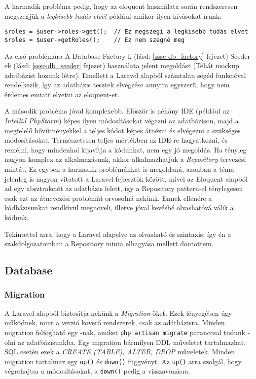 \documentclass[a4paper,12pt]{thesis-ekf}
\theoremstyle{definition}
\begin{document}
				A harmadik probléma pedig, hogy az eloquent használata során rendszeresen megszegjük a \emph{legkisebb tudás elvét} például amikor ilyen hívásokat írunk:
				\begin{lstlisting}
$roles = $user->roles->get();  // Ez megszegi a legkisebb tudás elvét
$roles = $user->getRoles();    // Ez nem szegné meg
				\end{lstlisting}
				
				Az első problémára A Database Factory-k (lásd: \ref{sssc-db_factory} fejezet) Seeder-ek (lásd: \ref{sssc-db_seeder} fejezet) használata jelent megoldást (Tehát mockup adatbázist hozunk létre). Emellett a Laravel alapból számtalan segéd funkcióval rendelkezik, így az adatbázis tesztek elvégzése annyira egyszerű, hogy nem érdemes emiatt elvetni az eloquent-et.
				
				 A második probléma jóval komplexebb. Először is néhány IDE (például az \emph{IntelliJ PhpStorm}) képes ilyen módosításokat végezni az adatbázison, majd a megfelelő bővítményekkel a teljes kódot képes átnézni és elvégezni a szükséges módosításokat. Természetesen teljes mértékben az IDE-re hagyatkozni, és remélni, hogy mindenhol kijavítja a kódunkat, nem egy jó megoldás. Ha tényleg nagyon komplex az alkalmazásunk, akkor alkalmazhatjuk a \emph{Repository} tervezési mintát. Ez egyben a harmadik problémánkat is megoldaná, azonban a téma jelenleg is nagyon vitatott a Laravel fejlesztők között, mivel az Eloquent alapból ad egy absztrakciót az adatbázis felett, így a Repository pattern-el ténylegesen csak ezt az átnevezési problémát orvosolná nekünk. Ennek ellenére a kódbázisunkat rendkívül megnöveli, illetve jóval kevésbé olvashatóvá válik a kódunk.
				 
				 Tekintettel arra, hogy a Laravel alapelve az olvasható és  szintaxis, így én a szakdolgozatomban a Repository minta elhagyása mellett döntöttem.
			
			\subsection{Database}
				\subsubsection{Migration}
					A Laravel alapból biztosítja nekünk a \emph{Migration}-öket. Ezek lényegében úgy működnek, mint a verzió követő rendszerek, csak az adátbázisra. Minden migration felfogható egy \emph{}-nak, amiket \texttt{php artisan migrate} paranccsal tudunk \emph{}-olni az adatbázisunkba. Egy migration bármilyen DDL műveletet tartalmazhat. SQL esetén ezek a \emph{CREATE (TABLE), ALTER, DROP} műveletek. Minden migration tartalmaz egy \texttt{up()} és \texttt{down()} függvényt. Az \texttt{up()} arra szolgál, hogy végrehajtsa a módosításokat, a \texttt{down()} pedig a visszavonásra.
					
\end{document}
